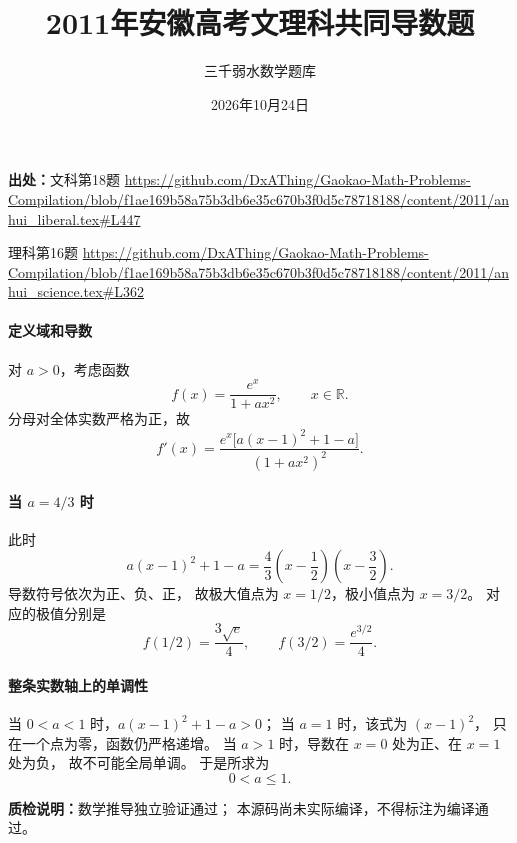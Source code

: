 \documentclass[UTF8,a4paper,11pt]{ctexart}
\title{2011年安徽高考文理科共同导数题}
\author{三千弱水数学题库}
\date{2026年10月24日}
\begin{document}
\maketitle
\noindent\textbf{出处：}文科第18题 \url{https://github.com/DxAThing/Gaokao-Math-Problems-Compilation/blob/f1ae169b58a75b3db6e35c670b3f0d5c78718188/content/2011/anhui_liberal.tex#L447}

\noindent 理科第16题 \url{https://github.com/DxAThing/Gaokao-Math-Problems-Compilation/blob/f1ae169b58a75b3db6e35c670b3f0d5c78718188/content/2011/anhui_science.tex#L362}

\paragraph{定义域和导数}
对 $a>0$，考虑函数
\[
f(x)=\frac{e^x}{1+ax^2},\qquad x\in\mathbb R.
\]
分母对全体实数严格为正，故
\[
f'(x)=\frac{e^x\bigl[a(x-1)^2+1-a\bigr]}{(1+ax^2)^2}.
\]

\paragraph{当 $a=4/3$ 时}
此时
\[
a(x-1)^2+1-a
=\frac43\left(x-\frac12\right)\left(x-\frac32\right).
\]
导数符号依次为正、负、正，
故极大值点为 $x=1/2$，极小值点为 $x=3/2$。
对应的极值分别是
\[
f(1/2)=\frac{3\sqrt e}{4},\qquad
f(3/2)=\frac{e^{3/2}}4.
\]

\paragraph{整条实数轴上的单调性}
当 $0<a<1$ 时，$a(x-1)^2+1-a>0$；
当 $a=1$ 时，该式为 $(x-1)^2$，
只在一个点为零，函数仍严格递增。
当 $a>1$ 时，导数在 $x=0$ 处为正、在 $x=1$ 处为负，
故不可能全局单调。
于是所求为
\[
\boxed{0<a\le1}.
\]

\bigskip
\noindent\textbf{质检说明：}数学推导独立验证通过；
本源码尚未实际编译，不得标注为编译通过。
\end{document}
